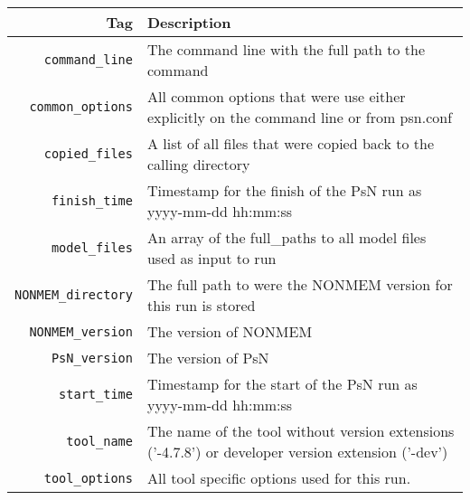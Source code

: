 \begin{center}
    \begin{tabularx}{\linewidth}{ r X }
    \hline
    Tag & Description \\ \hline
    \verb|command_line| & The command line with the full path to the command \\ \hline
    \verb|common_options| & All common options that were use either explicitly on the command line or from psn.conf \\ \hline
    \verb|copied_files| & A list of all files that were copied back to the calling directory \\ \hline
    \verb|finish_time| & Timestamp for the finish of the PsN run as yyyy-mm-dd hh:mm:ss \\ \hline
    \verb|model_files| & An array of the full\_paths to all model files used as input to run \\ \hline
    \verb|NONMEM_directory| & The full path to were the NONMEM version for this run is stored \\ \hline
    \verb|NONMEM_version| & The version of NONMEM \\ \hline
    \verb|PsN_version| & The version of PsN \\ \hline
    \verb|start_time| & Timestamp for the start of the PsN run as yyyy-mm-dd hh:mm:ss \\ \hline
    \verb|tool_name| & The name of the tool without version extensions \mbox{('-4.7.8')} or developer version extension ('-dev') \\ \hline
    \verb|tool_options| & All tool specific options used for this run. \\ \hline
  \end{tabularx}
\end{center}


